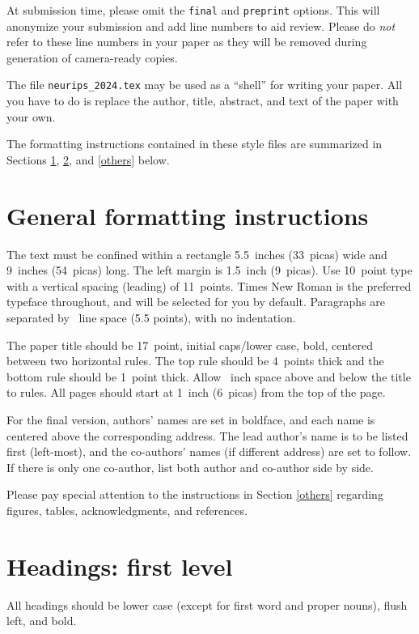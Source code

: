 \documentclass{article}
\begin{document}
At submission time, please omit the \verb+final+ and \verb+preprint+
options. This will anonymize your submission and add line numbers to aid
review. Please do \emph{not} refer to these line numbers in your paper as they
will be removed during generation of camera-ready copies.

The file \verb+neurips_2024.tex+ may be used as a ``shell'' for writing your
paper. All you have to do is replace the author, title, abstract, and text of
the paper with your own.

The formatting instructions contained in these style files are summarized in
Sections \ref{gen_inst}, \ref{headings}, and \ref{others} below.

\section{General formatting instructions}
\label{gen_inst}

The text must be confined within a rectangle 5.5~inches (33~picas) wide and
9~inches (54~picas) long. The left margin is 1.5~inch (9~picas).  Use 10~point
type with a vertical spacing (leading) of 11~points.  Times New Roman is the
preferred typeface throughout, and will be selected for you by default.
Paragraphs are separated by ~line space (5.5 points), with no
indentation.

The paper title should be 17~point, initial caps/lower case, bold, centered
between two horizontal rules. The top rule should be 4~points thick and the
bottom rule should be 1~point thick. Allow ~inch space above and
below the title to rules. All pages should start at 1~inch (6~picas) from the
top of the page.

For the final version, authors' names are set in boldface, and each name is
centered above the corresponding address. The lead author's name is to be listed
first (left-most), and the co-authors' names (if different address) are set to
follow. If there is only one co-author, list both author and co-author side by
side.

Please pay special attention to the instructions in Section \ref{others}
regarding figures, tables, acknowledgments, and references.

\section{Headings: first level}
\label{headings}

All headings should be lower case (except for first word and proper nouns),
flush left, and bold.
\end{document}
